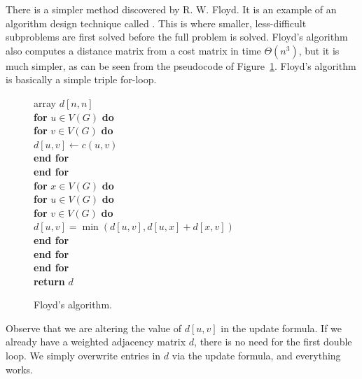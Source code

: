 There is a simpler method discovered by R. W. Floyd. It is an example of
an algorithm design technique called .
This is where smaller, less-difficult subproblems are first solved
before the full problem is solved. Floyd's algorithm also computes a
distance matrix from a cost matrix in time $\Theta(n^3)$, but it is much
simpler, as can be seen from the pseudocode of Figure~\ref{fig:floydcode}. Floyd's algorithm is basically a simple
triple for-loop.

\begin{figure}
\label{fig:floydcode}

{
array $d[n, n]$ \\

\textbf{for} $u \in V(G)$ \textbf{do} \\

\> \textbf{for} $v \in V(G)$ \textbf{do} \\

\> \> $d[u, v] \gets c(u, v)$\\

\> \textbf{end for} \\

\textbf{end for} \\

\textbf{for} $x \in V(G)$ \textbf{do}\\

 \> \textbf{for} $u \in V(G)$ \textbf{do}\\

 \> \> \textbf{for} $v \in V(G)$ \textbf{do}\\

\> \> \> $d[u,v] = \min( d[u,v], d[u,x] + d[x,v] )$ \\

\> \> \textbf{end for} \\

\> \textbf{end for} \\

\textbf{end for} \\

\textbf{return} $d$ \\
}
\caption{Floyd's algorithm.}

\end{figure}

\begin{note}
Observe that we are altering the value of $d[u, v]$ in the update
formula. If we already have a weighted adjacency matrix $d$, there is
no need for the first double loop. We simply overwrite entries in $d$
via the update formula, and everything works.

\end{note}

